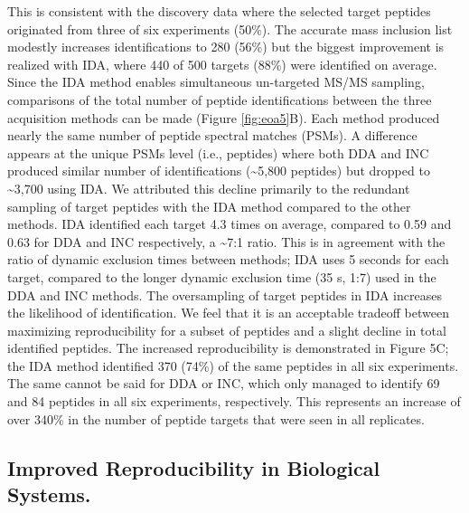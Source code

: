 This is consistent with the discovery data where the selected target peptides originated from three of six experiments (50\%). The accurate mass inclusion list modestly increases identifications to 280 (56\%) but the biggest improvement is realized with IDA, where 440 of 500 targets (88\%) were identified on average. Since the IDA method enables simultaneous un-targeted MS/MS sampling, comparisons of the total number of peptide identifications between the three acquisition methods can be made (Figure \ref{fig:eoa5}B). Each method produced nearly the same number of peptide spectral matches (PSMs). A difference appears at the unique PSMs level (i.e., peptides) where both DDA and INC produced similar number of identifications (\textasciitilde5,800 peptides) but dropped to \textasciitilde3,700 using IDA. We attributed this decline primarily to the redundant sampling of target peptides with the IDA method compared to the other methods. IDA identified each target 4.3 times on average, compared to 0.59 and 0.63 for DDA and INC respectively, a \textasciitilde7:1 ratio. This is in agreement with the ratio of dynamic exclusion times between methods; IDA uses 5 seconds for each target, compared to the longer dynamic exclusion time (35 s, 1:7) used in the DDA and INC methods. The oversampling of target peptides in IDA increases the likelihood of identification. We feel that it is an acceptable tradeoff between maximizing reproducibility for a subset of peptides and a slight decline in total identified peptides. The increased reproducibility is demonstrated in Figure 5C; the IDA method identified 370 (74\%) of the same peptides in all six experiments. The same cannot be said for DDA or INC, which only managed to identify 69 and 84 peptides in all six experiments, respectively. This represents an increase of over 340\% in the number of peptide targets that were seen in all replicates.

\subsection*{Improved Reproducibility in Biological Systems.}

